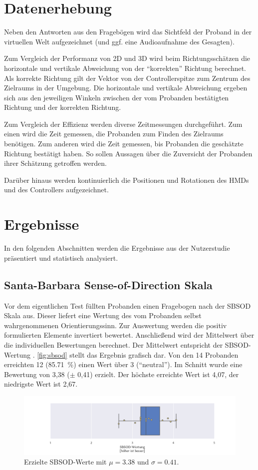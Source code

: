 \section{Datenerhebung}
Neben den Antworten aus den Fragebögen wird das Sichtfeld der Proband in der virtuellen Welt aufgezeichnet (und ggf. eine Audioaufnahme des Gesagten).

Zum Vergleich der Performanz von 2D und 3D wird beim Richtungsschätzen die horizontale und vertikale Abweichung von der \enquote{korrekten} Richtung berechnet.
Als korrekte Richtung gilt der Vektor von der Controllerspitze zum Zentrum des Zielraums in der Umgebung.
Die horizontale und vertikale Abweichung ergeben sich aus den jeweiligen Winkeln zwischen der vom Probanden bestätigten Richtung und der korrekten Richtung.

Zum Vergleich der Effizienz werden diverse Zeitmessungen durchgeführt.
Zum einen wird die Zeit gemessen, die Probanden zum Finden des Zielraums benötigen.
Zum anderen wird die Zeit gemessen, bis Probanden die geschätzte Richtung bestätigt haben.
So sollen Aussagen über die Zuversicht der Probanden ihrer Schätzung getroffen werden.

Darüber hinaus werden kontinuierlich die Positionen und Rotationen des HMDs und des Controllers aufgezeichnet.

\section{Ergebnisse}
In den folgenden Abschnitten werden die Ergebnisse aus der Nutzerstudie präsentiert und statistisch analysiert.

\subsection{Santa-Barbara Sense-of-Direction Skala}
Vor dem eigentlichen Test füllten Probanden einen Fragebogen nach der SBSOD Skala aus.
Dieser liefert eine Wertung des vom Probanden selbst wahrgenommenen Orientierungssinn.
Zur Auswertung werden die positiv formulierten Elemente invertiert bewertet.
Anschließend wird der Mittelwert über die individuellen Bewertungen berechnet.
Der Mittelwert entspricht der SBSOD-Wertung \parencite{Hegarty2002}.
\autoref{fig:sbsod} stellt das Ergebnis grafisch dar.
Von den 14 Probanden erreichten 12 (\SI{85,71}{\percent}) einen Wert über 3 (\enquote{neutral}).
Im Schnitt wurde eine Bewertung von 3,38 ($\pm$ 0,41) erzielt.
Der höchste erreichte Wert ist 4,07, der niedrigste Wert ist 2,67.
\begin{figure}[h]
    \centering
    \includegraphics[trim={3cm, 0, 2.5cm, 0}, clip, width=\linewidth]{figures/analysis/sbsod}
    \caption{Erzielte SBSOD-Werte mit $\mu = \num{3,38}$ und $\sigma = \num{0,41}$.}
    \label{fig:sbsod}
\end{figure}

